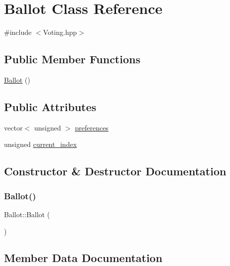 \hypertarget{classBallot}{}\section{Ballot Class Reference}
\label{classBallot}


{\ttfamily \#include $<$Voting.\+hpp$>$}

\subsection*{Public Member Functions}
\begin{DoxyCompactItemize}
\item 
\hyperlink{classBallot_af9078126260b3f58ea91f6b82797396b}{Ballot} ()
\end{DoxyCompactItemize}
\subsection*{Public Attributes}
\begin{DoxyCompactItemize}
\item 
vector$<$ unsigned $>$ \hyperlink{classBallot_a8210cf254af4cf9fa1d1e7f7f4230ceb}{preferences}
\item 
unsigned \hyperlink{classBallot_a005c249e5f40e6d3f1ee5eaa1ad8a60f}{current\+\_\+index}
\end{DoxyCompactItemize}


\subsection{Constructor \& Destructor Documentation}
\mbox{\label{classBallot_af9078126260b3f58ea91f6b82797396b}} 
\subsubsection{\texorpdfstring{Ballot()}{Ballot()}}
{\footnotesize\ttfamily Ballot\+::\+Ballot (\begin{DoxyParamCaption}{ }\end{DoxyParamCaption})\hspace{0.3cm}{\ttfamily [inline]}}



\subsection{Member Data Documentation}
\mbox{\label{classBallot_a005c249e5f40e6d3f1ee5eaa1ad8a60f}} 
